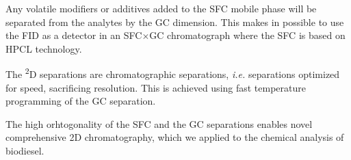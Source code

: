Any volatile modifiers or additives added to the SFC mobile phase will be separated from
the analytes by the GC dimension. This makes in possible to use the FID as a detector
in an SFC$\times$GC chromatograph where the SFC is based on HPCL technology.

The \textsuperscript{2}D separations are  chromatographic
separations, \textit{i.e.} separations optimized for speed, sacrificing
resolution. This is achieved using fast temperature programming of the GC
separation.

The high orhtogonality of the SFC and the GC separations enables novel comprehensive 2D
chromatography, which we applied to the chemical analysis of biodiesel.
